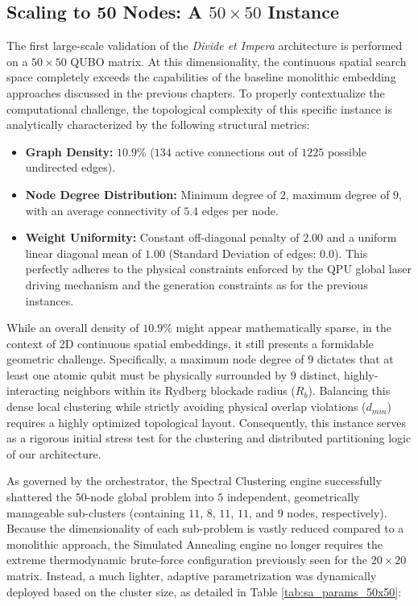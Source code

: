 \subsection{Scaling to 50 Nodes: A $50\times50$ Instance}
\label{subsec:divide_et_impera_50x50}

The first large-scale validation of the \textit{Divide et Impera} architecture is performed on a $50\times50$ QUBO matrix. At this dimensionality, the continuous spatial search space completely exceeds the capabilities of the baseline monolithic embedding approaches discussed in the previous chapters. To properly contextualize the computational challenge, the topological complexity of this specific instance is analytically characterized by the following structural metrics:

\begin{itemize}
    \item \textbf{Graph Density:} $10.9\%$ ($134$ active connections out of $1225$ possible undirected edges).
    \item \textbf{Node Degree Distribution:} Minimum degree of $2$, maximum degree of $9$, with an average connectivity of $5.4$ edges per node.
    \item \textbf{Weight Uniformity:} Constant off-diagonal penalty of $2.00$ and a uniform linear diagonal mean of $1.00$ (Standard Deviation of edges: $0.0$). This perfectly adheres to the physical constraints enforced by the QPU global laser driving mechanism and the generation constraints as for the previous instances.
\end{itemize}

While an overall density of $10.9\%$ might appear mathematically sparse, in the context of 2D continuous spatial embeddings, it still presents a formidable geometric challenge. Specifically, a maximum node degree of $9$ dictates that at least one atomic qubit must be physically surrounded by $9$ distinct, highly-interacting neighbors within its Rydberg blockade radius ($R_b$). Balancing this dense local clustering while strictly avoiding physical overlap violations ($d_{min}$) requires a highly optimized topological layout. Consequently, this instance serves as a rigorous initial stress test for the clustering and distributed partitioning logic of our architecture.

As governed by the orchestrator, the Spectral Clustering engine successfully shattered the $50$-node global problem into $5$ independent, geometrically manageable sub-clusters (containing $11$, $8$, $11$, $11$, and $9$ nodes, respectively). Because the dimensionality of each sub-problem is vastly reduced compared to a monolithic approach, the Simulated Annealing engine no longer requires the extreme thermodynamic brute-force configuration previously seen for the $20\times20$ matrix. Instead, a much lighter, adaptive parametrization was dynamically deployed based on the cluster size, as detailed in Table \ref{tab:sa_params_50x50}:

